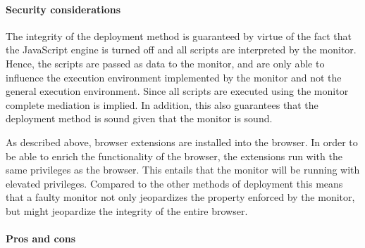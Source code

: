 \documentclass{llncs}
\begin{document}


\vspace{-.4cm}
\paragraph{Security considerations}

The integrity of the deployment method is guaranteed by virtue of the fact that
the JavaScript engine is turned off and all scripts are interpreted by the
monitor.  Hence, the scripts are passed as data to the monitor, and are only
able to influence the execution environment implemented by the monitor and not
the general execution environment.  Since all scripts are executed using the
monitor complete mediation is implied.  In addition, this also guarantees that
the deployment method is sound given that the monitor is sound. 

As described above, browser extensions are installed into the browser. In order
to be able to enrich the functionality of the browser, the extensions run with
the same privileges as the browser. This entails that the monitor will be
running with elevated privileges. Compared to the other methods of deployment
this means that a faulty monitor not only jeopardizes the property enforced by
the monitor, but might jeopardize the integrity of the entire browser.

\vspace{-.4cm}
\paragraph{Pros and cons}
\end{document}
